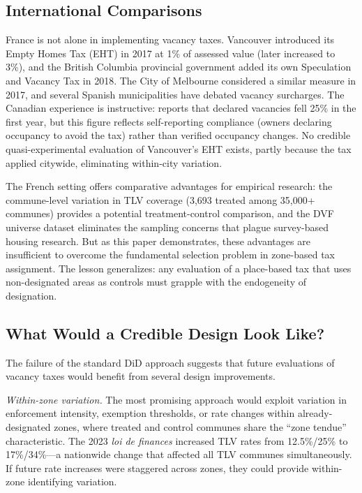 \documentclass[12pt]{article}
\begin{document}
\subsection{International Comparisons}

France is not alone in implementing vacancy taxes. Vancouver introduced its Empty Homes Tax (EHT) in 2017 at 1\% of assessed value (later increased to 3\%), and the British Columbia provincial government added its own Speculation and Vacancy Tax in 2018. The City of Melbourne considered a similar measure in 2017, and several Spanish municipalities have debated vacancy surcharges. The Canadian experience is instructive: \citet{vancouver2019vacancy} reports that declared vacancies fell 25\% in the first year, but this figure reflects self-reporting compliance (owners declaring occupancy to avoid the tax) rather than verified occupancy changes. No credible quasi-experimental evaluation of Vancouver's EHT exists, partly because the tax applied citywide, eliminating within-city variation.

The French setting offers comparative advantages for empirical research: the commune-level variation in TLV coverage (3,693 treated among 35,000+ communes) provides a potential treatment-control comparison, and the DVF universe dataset eliminates the sampling concerns that plague survey-based housing research. But as this paper demonstrates, these advantages are insufficient to overcome the fundamental selection problem in zone-based tax assignment. The lesson generalizes: any evaluation of a place-based tax that uses non-designated areas as controls must grapple with the endogeneity of designation.

\subsection{What Would a Credible Design Look Like?}

The failure of the standard DiD approach suggests that future evaluations of vacancy taxes would benefit from several design improvements.

\textit{Within-zone variation.} The most promising approach would exploit variation in enforcement intensity, exemption thresholds, or rate changes within already-designated zones, where treated and control communes share the ``zone tendue'' characteristic. The 2023 \textit{loi de finances} increased TLV rates from 12.5\%/25\% to 17\%/34\%---a nationwide change that affected all TLV communes simultaneously. If future rate increases were staggered across zones, they could provide within-zone identifying variation.
\end{document}
